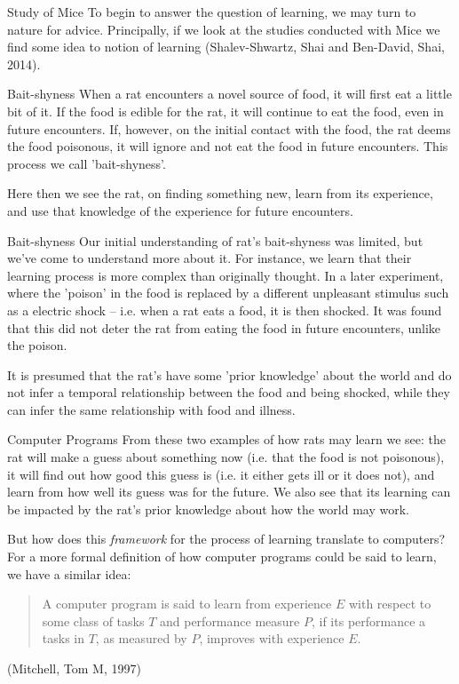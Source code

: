 \documentclass[10pt]{beamer}
\begin{document}
\begin{frame}[label={sec:org0749b53}]{Study of Mice}
To begin to answer the question of learning, we may turn to nature for
advice. Principally, if we look at the studies conducted with Mice we find some idea
to notion of learning (Shalev-Shwartz, Shai and Ben-David, Shai, 2014).
\end{frame}

\begin{frame}[label={sec:orga45af28}]{Bait-shyness}
When a rat encounters a novel source of food, it will first eat a little bit of
it. If the food is edible for the rat, it will continue to eat the food, even in
future encounters. If, however, on the initial contact with the food, the rat deems
the food poisonous, it will ignore and not eat the food in future encounters. This
process we call 'bait-shyness'.

Here then we see the rat, on finding something new, learn from its experience, and
use that knowledge of the experience for future encounters.
\end{frame}

\begin{frame}[label={sec:org3960f47}]{Bait-shyness}
Our initial understanding of rat's bait-shyness was limited, but we've come to
understand more about it. For instance, we learn that their learning process is more
complex than originally thought. In a later experiment, where the 'poison' in the
food is replaced by a different unpleasant stimulus such as a electric shock --
i.e. when a rat eats a food, it is then shocked. It was found that this did not
deter the rat from eating the food in future encounters, unlike the poison.

It is presumed that the rat's have some 'prior knowledge' about the world and do not
infer a temporal relationship between the food and being shocked, while they can
infer the same relationship with food and illness.
\end{frame}

\begin{frame}[label={sec:org4a0045e}]{Computer Programs}
From these two examples of how rats may learn we see: the rat will make a guess about
something now (i.e. that the food is not poisonous), it will find out how good this
guess is (i.e. it either gets ill or it does not), and learn from how well its guess
was for the future. We also see that its learning can be impacted by the rat's prior
knowledge about how the world may work.

But how does this \emph{framework} for the process of learning translate to computers? For a
more formal definition of how computer programs could be said to learn, we have a
similar idea:

\begin{quote}
A computer program is said to learn from experience \(E\) with respect
to some class of tasks \(T\) and performance measure \(P\), if its performance
a tasks in \(T\), as measured by \(P\), improves with experience \(E\).
\end{quote}

(Mitchell, Tom M, 1997)
\end{frame}
\end{document}
